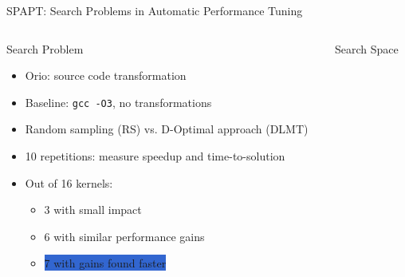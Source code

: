 \documentclass[10pt, compress, aspectratio=169, xcolor={table,usenames,dvipsnames}]{beamer}
\begin{document}
\begin{frame}[label={sec:org702d255},fragile]{SPAPT: Search Problems in Automatic Performance Tuning}
 \begin{columns}
\begin{column}{0.41\columnwidth}
\begin{block}{Search Problem}
\begin{itemize}
\item \alert{Orio}: source code transformation
\item Baseline: \texttt{gcc -O3}, no transformations
\item Random sampling (\alert{RS}) vs. D-Optimal approach (\alert{DLMT})
\item 10 repetitions: measure \alert{speedup} and \alert{time-to-solution}
\item Out of 16 kernels:
\begin{itemize}
\item 3 with small impact
\item 6 with similar performance gains
\item \colorbox{Highlight}{7 with \alert{gains found faster}}
\end{itemize}
\end{itemize}
\end{block}
\end{column}
\begin{column}{0.59\columnwidth}
\begin{block}{Search Space}
\vspace{-0.4cm}


\end{block}
\end{column}
\end{columns}
\end{frame}
\end{document}
